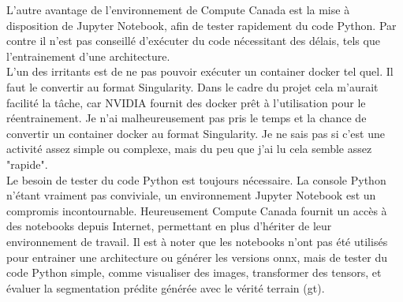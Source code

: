 \noindent L'autre avantage de l'environnement de Compute Canada est la mise à disposition de Jupyter Notebook, afin de tester rapidement du code Python. Par contre il n'est pas conseillé d'exécuter du code nécessitant des délais, tels que l'entrainement d'une architecture. 
\vspace{\baselineskip}
\\
\noindent L'un des irritants est de ne pas pouvoir exécuter un container docker tel quel. Il faut le convertir au format Singularity. Dans le cadre du projet cela m'aurait facilité la tâche, car NVIDIA fournit des docker prêt à l'utilisation pour le réentrainement. Je n'ai malheureusement pas pris le temps et la chance de convertir un container docker au format Singularity. Je ne sais pas si c'est une activité assez simple ou complexe, mais du peu que j'ai lu cela semble assez "rapide".
\vspace{\baselineskip}
\\
\noindent Le besoin de tester du code Python est toujours nécessaire. La console Python n'étant vraiment pas conviviale, un environnement Jupyter Notebook est un compromis incontournable. Heureusement Compute Canada fournit un accès à des notebooks depuis Internet, permettant en plus d'hériter de leur environnement de travail. Il est à noter que les notebooks n'ont pas été utilisés pour entrainer une architecture ou générer les versions \acrshort{onnx}, mais de tester du code Python simple, comme visualiser des images, transformer des tensors, et évaluer la segmentation prédite générée avec le vérité terrain (\acrshort{gt}). 
